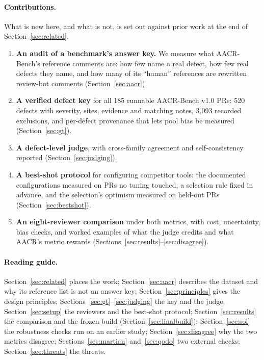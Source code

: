\documentclass[11pt,a4paper]{article}
\begin{document}
\paragraph{Contributions.} What is new here, and what is not, is set out
against prior work at the end of Section~\ref{sec:related}.
\begin{enumerate}
  \item \textbf{An audit of a benchmark's answer key.} We measure what
  AACR-Bench's reference comments are: how few name a real defect, how few
  real defects they name, and how many of its ``human'' references are
  rewritten review-bot comments (Section~\ref{sec:aacr}).
  \item \textbf{A verified defect key} for all 185 runnable AACR-Bench v1.0
  PRs: 520 defects with severity, sites, evidence and matching notes, 3{,}093
  recorded exclusions, and per-defect provenance that lets pool bias be
  measured (Section~\ref{sec:gt}).
  \item \textbf{A defect-level judge}, with cross-family agreement and
  self-consistency reported (Section~\ref{sec:judging}).
  \item \textbf{A best-shot protocol} for configuring competitor tools: the
  documented configurations measured on PRs no tuning touched, a selection
  rule fixed in advance, and the selection's optimism measured on held-out
  PRs (Section~\ref{sec:bestshot}).
  \item \textbf{An eight-reviewer comparison} under both metrics, with cost,
  uncertainty, bias checks, and worked examples of what the judge credits and
  what AACR's metric rewards (Sections~\ref{sec:results}--\ref{sec:disagree}).
\end{enumerate}

\paragraph{Reading guide.} Section~\ref{sec:related} places the work;
Section~\ref{sec:aacr} describes the dataset and why its reference list is
not an answer key; Section~\ref{sec:principles} gives the design principles;
Sections~\ref{sec:gt}--\ref{sec:judging} the key and the judge;
Section~\ref{sec:setup} the reviewers and the best-shot protocol;
Section~\ref{sec:results} the comparison and the frozen build
(Section~\ref{sec:finalbuild}); Section~\ref{sec:sol} the
robustness checks run on an earlier study; Section~\ref{sec:disagree} why the
two metrics disagree; Sections~\ref{sec:martian} and~\ref{sec:qodo} two
external checks; Section~\ref{sec:threats} the threats.
\end{document}
